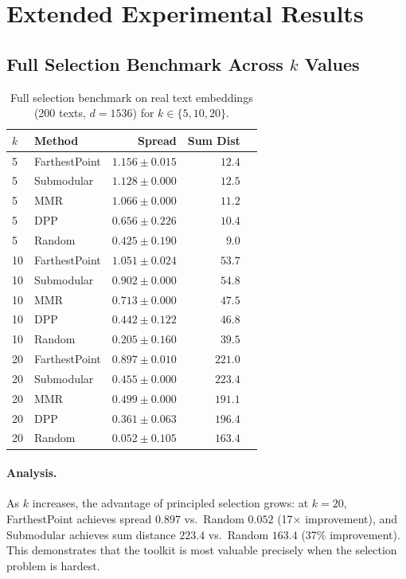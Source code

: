 \documentclass[11pt]{article}
\begin{document}
\section{Extended Experimental Results}
\label{app:extended}

\subsection{Full Selection Benchmark Across $k$ Values}

\begin{table}[H]
\centering
\small
\caption{Full selection benchmark on real text embeddings
(200 texts, $d=1536$) for $k \in \{5, 10, 20\}$.}
\label{tab:full_benchmark}
\begin{tabular}{llrrr}
\toprule
$k$ & Method & Spread & Sum Dist \\
\midrule
5 & FarthestPoint & $1.156 \pm 0.015$ & $12.4$ \\
5 & Submodular    & $1.128 \pm 0.000$ & $12.5$ \\
5 & MMR           & $1.066 \pm 0.000$ & $11.2$ \\
5 & DPP           & $0.656 \pm 0.226$ & $10.4$ \\
5 & Random        & $0.425 \pm 0.190$ & $9.0$ \\
\midrule
10 & FarthestPoint & $1.051 \pm 0.024$ & $53.7$ \\
10 & Submodular    & $0.902 \pm 0.000$ & $54.8$ \\
10 & MMR           & $0.713 \pm 0.000$ & $47.5$ \\
10 & DPP           & $0.442 \pm 0.122$ & $46.8$ \\
10 & Random        & $0.205 \pm 0.160$ & $39.5$ \\
\midrule
20 & FarthestPoint & $0.897 \pm 0.010$ & $221.0$ \\
20 & Submodular    & $0.455 \pm 0.000$ & $223.4$ \\
20 & MMR           & $0.499 \pm 0.000$ & $191.1$ \\
20 & DPP           & $0.361 \pm 0.063$ & $196.4$ \\
20 & Random        & $0.052 \pm 0.105$ & $163.4$ \\
\bottomrule
\end{tabular}
\end{table}

\paragraph{Analysis.}
As $k$ increases, the advantage of principled selection grows:
at $k=20$, FarthestPoint achieves spread $0.897$ vs.\ Random $0.052$
(17$\times$ improvement), and Submodular achieves sum distance $223.4$
vs.\ Random $163.4$ (37\% improvement). This demonstrates that
the toolkit is most valuable precisely when the selection problem
is hardest.
\end{document}
